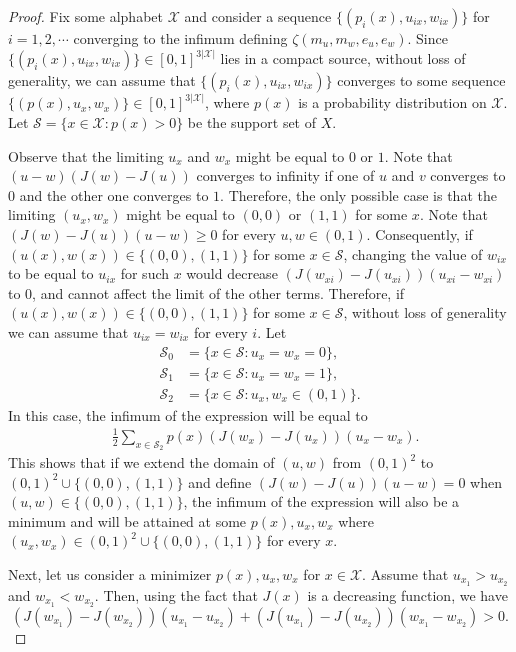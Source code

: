 \documentclass[conference,letterpaper,onecolumn]{IEEEtran}
\theoremstyle{plain}%
\begin{document}
\begin{proof}

Fix some alphabet $\mathcal{X}$ and consider  a sequence 
$\{(p_i(x), u_{ix}, w_{ix})\}$ for $i=1,2,\cdots$ converging to the infimum defining $\zeta(m_u,m_w,e_u,e_w)$. Since $\{(p_i(x), u_{ix}, w_{ix})\}\in[0,1]^{3|\mathcal{X}|}$ lies in a compact source, without loss of generality, we can assume that 
$\{(p_i(x), u_{ix}, w_{ix})\}$ converges to some sequence $\{(p(x), u_x, w_x)\}\in[0,1]^{3|\mathcal{X}|}$, where $p(x)$ is a probability distribution on $\mathcal{X}$. Let $\mathcal{S}=\{x\in\mathcal{X}: p(x)>0\}$ be the support set of $X$.

Observe that the limiting $u_x$ and $w_x$ might be equal to $0$ or $1$. Note that $(u-w)(J(w) - J(u))$ converges to infinity if one of $u$ and $v$ converges to $0$ and the other one converges to $1$. Therefore, the only possible case is that the limiting $(u_x,w_x)$ might be equal to $(0,0)$ or $(1,1)$ for some $x$. Note that 
$(J(w) - J(u))(u - w)\geq 0$ for every $u,w\in(0,1)$. Consequently, if $(u(x),w(x))\in\{(0,0),(1,1)\}$ for some $x\in\mathcal{S}$, changing the value of $w_{ix}$ to be equal to $u_{ix}$ for such $x$ would decrease $(J(w_{xi}) - J(u_{xi}))(u_{xi} - w_{xi})$ to $0$, and cannot affect the limit of the other terms. Therefore, if $(u(x),w(x))\in\{(0,0),(1,1)\}$ for some $x\in\mathcal{S}$, without loss of generality we can assume that $u_{ix}=w_{ix}$ for every $i$. Let 
\begin{align*}
    \mathcal{S}_0&=\{x\in\mathcal{S}: u_x=w_x=0\},\\
     \mathcal{S}_1&=\{x\in\mathcal{S}: u_x=w_x=1\},\\
      \mathcal{S}_2&=\{x\in\mathcal{S}: u_x,w_x\in(0,1)\}.
\end{align*}
In this case, the infimum of the expression will be equal to
\begin{align*}
    &\frac{1}{2}\sum_{x\in\mathcal{S}_2} p(x)(J(w_x) - J(u_x))(u_x - w_x).
\end{align*}
This shows that if we extend the domain of $(u,w)$ from $(0,1)^2$ to $(0,1)^2\cup \{(0,0),(1,1)\}$ and define
$(J(w) - J(u))(u - w)= 0$ when $(u,w)\in\{(0,0),(1,1)\}$, the infimum of the expression will also be a minimum and will be attained at some $p(x), u_x, w_x$ where $(u_x, w_x)\in(0,1)^2\cup \{(0,0),(1,1)\}$ for every $x$.


Next, let us consider a minimizer $p(x),u_x,w_x$ for $x\in\mathcal{X}$. Assume that $u_{x_1}>u_{x_2}$ and $w_{x_1}<w_{x_2}$. Then, using the fact that $J(x)$ is a decreasing function, we have
{$$(J(w_{x_1})- J(w_{x_2}))(u_{x_1}-u_{x_2})+ (J(u_{x_1})- J(u_{x_2}))(w_{x_1} -w_{x_2} )>0.$$}


\end{proof}
\end{document}
